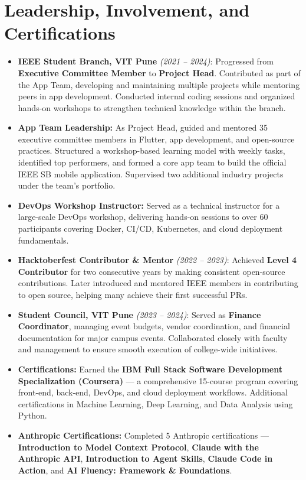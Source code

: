 \documentclass{article}
\begin{document}
\section{Leadership, Involvement, and Certifications}
\small
\begin{itemize}[leftmargin=*, itemsep=1pt, topsep=1pt]

  \item \textbf{IEEE Student Branch, VIT Pune} \emph{(2021 -- 2024)}: 
  Progressed from \textbf{Executive Committee Member} to \textbf{Project Head}. Contributed as part of the App Team, developing and maintaining multiple projects while mentoring peers in app development. Conducted internal coding sessions and organized hands-on workshops to strengthen technical knowledge within the branch.

  \item \textbf{App Team Leadership:} 
  As Project Head, guided and mentored 35 executive committee members in Flutter, app development, and open-source practices. Structured a workshop-based learning model with weekly tasks, identified top performers, and formed a core app team to build the official IEEE SB mobile application. Supervised two additional industry projects under the team’s portfolio.

  \item \textbf{DevOps Workshop Instructor:} 
  Served as a technical instructor for a large-scale DevOps workshop, delivering hands-on sessions to over 60 participants covering Docker, CI/CD, Kubernetes, and cloud deployment fundamentals.

  \item \textbf{Hacktoberfest Contributor \& Mentor} \emph{(2022 -- 2023)}: 
  Achieved \textbf{Level 4 Contributor} for two consecutive years by making consistent open-source contributions. Later introduced and mentored IEEE members in contributing to open source, helping many achieve their first successful PRs.

  \item \textbf{Student Council, VIT Pune} \emph{(2023 -- 2024)}: 
  Served as \textbf{Finance Coordinator}, managing event budgets, vendor coordination, and financial documentation for major campus events. Collaborated closely with faculty and management to ensure smooth execution of college-wide initiatives.

  \item \textbf{Certifications:} 
  Earned the \textbf{IBM Full Stack Software Development Specialization (Coursera)} — a comprehensive 15-course program covering front-end, back-end, DevOps, and cloud deployment workflows. Additional certifications in Machine Learning, Deep Learning, and Data Analysis using Python.

  \item \textbf{Anthropic Certifications:} 
  Completed 5 Anthropic certifications — \textbf{Introduction to Model Context Protocol}, \textbf{Claude with the Anthropic API}, \textbf{Introduction to Agent Skills}, \textbf{Claude Code in Action}, and \textbf{AI Fluency: Framework \& Foundations}.

\end{itemize}
\end{document}
